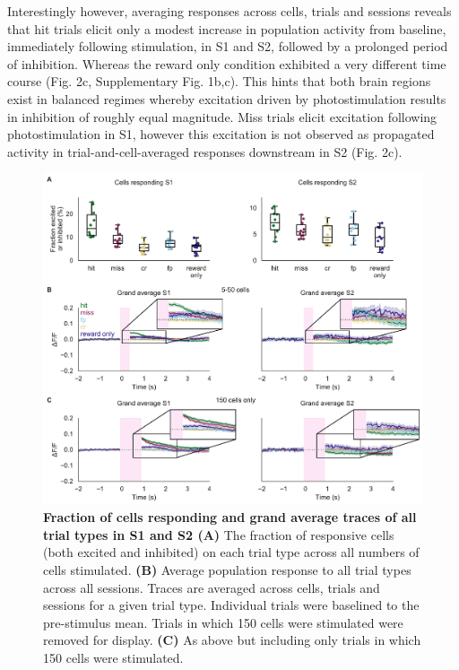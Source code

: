 \begin{figure}[htbp]
{} 
\label{fig:basic-analysis}
\end{figure}

Interestingly however, averaging responses across cells, trials and sessions reveals that hit trials elicit only a modest increase in population activity from baseline, immediately following stimulation, in S1 and S2, followed by a prolonged period of inhibition. Whereas the reward only condition exhibited a very different time course (Fig. 2c,  Supplementary Fig. 1b,c). This hints that both brain regions exist in balanced regimes whereby excitation driven by photostimulation results in inhibition of roughly equal magnitude. Miss trials elicit excitation following photostimulation in S1, however this excitation is not observed as propagated activity in trial-and-cell-averaged responses downstream in S2 (Fig. 2c). 

\begin{figure}[h]
\hspace*{-0.25in}
\includegraphics[scale=0.65]{figures/supplements/Supplementary_Figure1.pdf}
\caption[\textbf{Fraction of cells responding and grand average traces of all trial types in S1 and S2}]{\textbf{ Fraction of cells responding and grand average traces of all trial types in S1 and S2
 (A)} The fraction of responsive cells (both excited and inhibited) on each trial type across all numbers of cells stimulated. \textbf{(B)} Average population response to all trial types across all sessions. Traces are averaged across cells, trials and sessions for a given trial type. Individual trials were baselined to the pre-stimulus mean. Trials in which 150 cells were stimulated were removed for display. \textbf{(C)} As above but including only trials in which 150 cells were stimulated. 
} 
\label{fig:supp1}
\end{figure}



